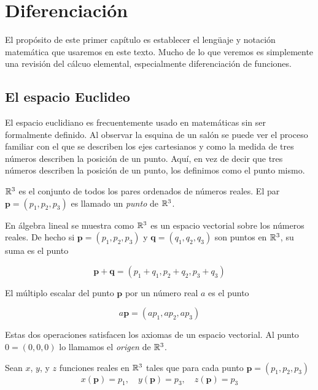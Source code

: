 \chapter{Diferenciación}\label{ch:01}

El propósito de este primer capítulo es establecer el lengüaje y notación matemática que usaremos 
en este texto. Mucho de lo que veremos es simplemente una revisión del cálcuo elemental,
especialmente diferenciación de funciones.

\section{El espacio Euclideo}

El espacio euclidiano es frecuentemente usado en matemáticas sin ser formalmente definido. Al observar la
esquina de un salón se puede ver el proceso familiar con el que se describen los ejes cartesianos y como la
medida de tres números describen la posición de un punto. Aquí, en vez de decir que tres números describen
la posición de un punto, los definimos como el punto mismo.

\begin{definition}
    $\mathbb{R}^{3}$ es el conjunto de todos los pares ordenados de números reales. El par $\bm{p} = (p_{1},p_{2},p_{3})$
    es llamado un \emph{punto} de $\mathbb{R}^{3}$.
\end{definition}

En álgebra lineal se muestra como $\mathbb{R}^{3}$ es un espacio vectorial sobre los números reales. De hecho si
$\bm{p} = (p_{1},p_{2},p_{3})$ y $\bm{q} = (q_{1},q_{2},q_{3})$ son puntos en $\mathbb{R}^{3}$, su suma es el punto

$$ \bm{p} + \bm{q} = (p_{1} + q_{1}, p_{2} + q_{2}, p_{3} + q_{3}) $$

El múltiplo escalar del punto $\bm{p}$ por un número real $a$ es el punto

$$ a\bm{p} = (ap_{1}, ap_{2}, ap_{3}) $$

Estas dos operaciones satisfacen los axiomas de un espacio vectorial. Al punto $ 0 = (0,0,0)$ lo llamamos el
\emph{origen} de $\mathbb{R}^{3}$.

\begin{definition}
    Sean $x$, $y$, y $z$ funciones reales en $\mathbb{R}^{3}$ tales que para cada punto $\bm{p} = (p_{1},p_{2},p_{3})$
    $$ x(\bm{p}) = p_{1}, \quad y(\bm{p}) = p_{3}, \quad z(\bm{p}) = p_{3} $$

\end{definition}


